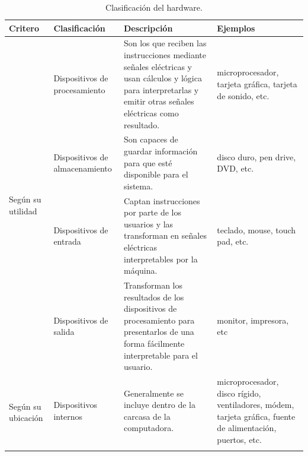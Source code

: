 \documentclass[
]{book}
\begin{document}
\begin{table}[H]
\caption{Clasificación del hardware.}
\begin{tabular}{ p{3.5cm} p{2.5cm} p{6cm}p{4cm}}
\toprule
Critero                               & Clasificación                       & Descripción                                                                                                                                                                                    & Ejemplos                                                                                                        \\ \midrule
\multirow{4}{*}{Según su utilidad}    & Dispositivos de procesamiento       & Son los que reciben las instrucciones mediante señales eléctricas y usan cálculos y lógica para interpretarlas y emitir otras señales eléctricas como resultado.                               & microprocesador, tarjeta gráfica, tarjeta de sonido, etc.                                                       \\ \cmidrule(l){2-4} 
                                      & Dispositivos de almacenamiento      & Son capaces de guardar información para que esté disponible para el sistema.                                                                                                                   & disco duro, pen drive, DVD, etc.                                                                                \\ \cmidrule(l){2-4} 
                                      & Dispositivos de entrada             & Captan instrucciones por parte de los usuarios y las transforman en señales eléctricas interpretables por la máquina.                                                                          & teclado, mouse, touch pad, etc.                                                                                 \\ \cmidrule(l){2-4} 
                                      & Dispositivos de salida              & Transforman los resultados de los dispositivos de procesamiento para presentarlos de una forma fácilmente interpretable para el usuario.                                                       & monitor, impresora, etc                                                                                         \\ \midrule
\multirow{2}{*}{Según su ubicación}   & Dispositivos internos               & Generalmente se incluye dentro de la carcasa de la computadora.                                                                                                                                & microprocesador, disco rígido, ventiladores, módem, tarjeta gráfica, fuente de alimentación, puertos, etc.      \\ \cmidrule(l){2-4} 

\end{tabular}
\end{table}
\end{document}
